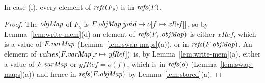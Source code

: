 \begin{lemma}
\label{lem:swap-stack-refs}
In case (i), every element of $\mathit{refs}(F_s)$ is in $\mathit{refs}(F)$.
\end{lemma}
\begin{proof}
The $\mathit{objMap}$ of $F_s$ is $F.\mathit{objMap}[yoid \mapsto o[f \mapsto \mathit{xRef}]]$, so by
Lemma~\ref{lem:write-mem}(d) an element of $\mathit{refs}(F_s.\mathit{objMap})$ is either $\mathit{xRef}$, which is a
value of $F.\mathit{varMap}$ (Lemma~\ref{lem:swap-maps}(a)), or in $\mathit{refs}(F.\mathit{objMap})$. An element of
$\mathit{values}(F.\mathit{varMap}[x \mapsto \mathit{yfRef}])$ is, by Lemma~\ref{lem:write-mem}(a), either a
value of $F.\mathit{varMap}$ or $\mathit{yfRef} = o(f)$, which is in $\mathit{refs}(o)$ (Lemma~\ref{lem:swap-maps}(a))
and hence in $\mathit{refs}(F.\mathit{objMap})$ by Lemma~\ref{lem:stored}(a).
\end{proof}

